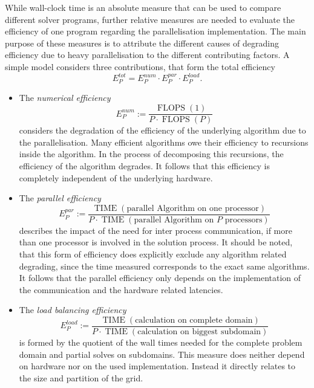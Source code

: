 While wall-clock time is an absolute measure that can be used to compare different solver programs, further relative measures are needed to evaluate the efficiency of one program regarding the parallelisation implementation. The main purpose of these measures is to attribute the different causes of degrading efficiency due to heavy parallelisation to the different contributing factors. A simple model \cite{ferziger02,schaefer99} considers three contributions, that form the total efficiency
\begin{displaymath}
  E^{tot}_P = E^{num}_P \cdot E^{par}_P \cdot E^{load}_P.
\end{displaymath}
\begin{itemize}
  \item[] The \emph{numerical efficiency}
  \begin{displaymath} E^{num}_P := \frac{\operatorname{FLOPS}(1)}{P \cdot \operatorname{FLOPS}(P)}\end{displaymath} 
    considers the degradation of the efficiency of the underlying algorithm due to the parallelisation. Many efficient algorithms owe their efficiency to recursions inside the algorithm. In the process of decomposing this recursions, the efficiency of the algorithm degrades. It follows that this efficiency is completely independent of the underlying hardware.
  \item[] The \emph{parallel efficiency}
    \begin{displaymath} E^{par}_P :=\frac{\operatorname{TIME}(\text{parallel Algorithm on one processor})}{P \cdot \operatorname{TIME}(\text{parallel Algorithm on \(P\) processors})} \end{displaymath} 
      describes the impact of the need for inter process communication, if more than one processor is involved in the solution process. It should be noted, that this form of efficiency does explicitly exclude any algorithm related degrading, since the time measured corresponds to the exact same algorithms. It follows that the parallel efficiency only depends on the implementation of the communication and the hardware related latencies.
  \item[] The \emph{load balancing efficiency} 
    \begin{displaymath} E^{load}_P :=\frac{\operatorname{TIME}(\text{calculation on complete domain})}{P \cdot \operatorname{TIME}(\text{calculation on biggest subdomain})} \end{displaymath}
       is formed by the quotient of the wall times needed for the complete problem domain and partial solves on subdomains. This measure does neither depend on hardware nor on the used implementation. Instead it directly relates to the size and partition of the grid. 
\end{itemize}


